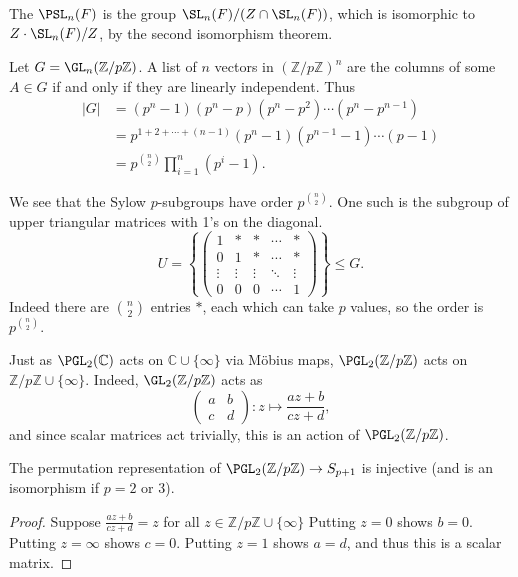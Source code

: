 \documentclass[a4paper]{scrartcl}
\begin{document}
\begin{definition}
	The  $\PSL_n(F)$ is the group $\SL_n(F) / (Z \cap  \SL_n(F))$, which is isomorphic to $Z\cdot \SL_n(F) / Z$, by the second isomorphism theorem.
\end{definition}

\begin{example}
	Let $G = \GL_n(\mathbb{Z}/p\mathbb{Z})$. A list of $n$ vectors in $(\mathbb{Z}/p\mathbb{Z})^n$ are the columns of some $A \in G$ if and only if they are linearly independent.
	Thus
	\begin{align*}
		|G| &= (p^n - 1)(p^n - p)(p^n - p^2) \cdots (p^n - p^{n - 1}) \\
		&= p^{1 + 2 + \cdots + (n - 1)}(p^n - 1)(p^{n - 1} - 1) \cdots (p - 1) \\
		&= p^{\binom{n}{2}} \prod_{i = 1}^n (p^i - 1).
	\end{align*}

	We see that the Sylow $p$-subgroups have order $p^{\binom{n}{2}}$. One such is the subgroup of upper triangular matrices with 1's on the diagonal.
	$$
	U = \left\{\begin{pmatrix}
		1 & * & * & \cdots & * \\
		0 & 1 & * & \cdots & * \\
		\vdots  &\vdots   & \vdots & \ddots &\vdots \\
		0 & 0 & 0 & \cdots & 1
	\end{pmatrix}\right\} \leq G.
	$$
	Indeed there are $\binom{n}{2}$ entries $*$, each which can take $p$ values, so the order is $p^{\binom{n}{2}}$.
\end{example}

Just as $\PGL_2(\mathbb{C})$ acts on $\mathbb{C} \cup \{\infty\}$ via Möbius maps, $\PGL_2(\mathbb{Z}/p\mathbb{Z})$ acts on $\mathbb{Z}/p\mathbb{Z} \cup \{\infty\}$.
Indeed, $\GL_2(\mathbb{Z}/p\mathbb{Z})$ acts as
$$
\begin{pmatrix}
	a & b\\
	c & d
\end{pmatrix}: z \longmapsto \frac{az + b}{cz + d},
$$
and since scalar matrices act trivially, this is an action of $\PGL_2(\mathbb{Z}/p\mathbb{Z})$.

\begin{lemma}
	The permutation representation of $\PGL_2(\mathbb{Z}/p\mathbb{Z}) \rightarrow S_{p + 1}$ is injective (and is an isomorphism if $p = 2$ or 3).
\end{lemma}
\begin{proof}
	Suppose $\frac{az + b}{cz + d} = z$ for all $z \in \mathbb{Z}/p\mathbb{Z} \cup \{\infty\}$ Putting $z = 0$ shows $b = 0$. Putting $z = \infty$ shows $c = 0$. Putting $z = 1$ shows $a = d$, and thus this is a scalar matrix. 
\end{proof}
\end{document}
